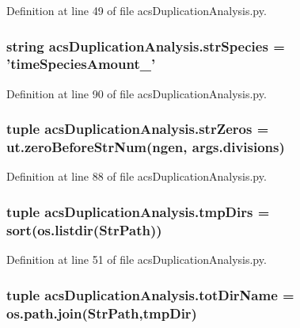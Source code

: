 Definition at line 49 of file acs\-Duplication\-Analysis.\-py.

\hypertarget{a00094_a16ce767c459a75b657e3a2592b4228d9}{
\subsubsection[{str\-Species}]{\setlength{\rightskip}{0pt plus 5cm}string acs\-Duplication\-Analysis.\-str\-Species = 'time\-Species\-Amount\-\_\-'}}\label{a00094_a16ce767c459a75b657e3a2592b4228d9}


Definition at line 90 of file acs\-Duplication\-Analysis.\-py.

\hypertarget{a00094_a234dce1a3fa6fada4ecff6272abe38f1}{
\subsubsection[{str\-Zeros}]{\setlength{\rightskip}{0pt plus 5cm}tuple acs\-Duplication\-Analysis.\-str\-Zeros = ut.\-zero\-Before\-Str\-Num(ngen, args.\-divisions)}}\label{a00094_a234dce1a3fa6fada4ecff6272abe38f1}


Definition at line 88 of file acs\-Duplication\-Analysis.\-py.

\hypertarget{a00094_a5030678434c0a50876042c56b443fb93}{
\subsubsection[{tmp\-Dirs}]{\setlength{\rightskip}{0pt plus 5cm}tuple acs\-Duplication\-Analysis.\-tmp\-Dirs = sort(os.\-listdir({\bf Str\-Path}))}}\label{a00094_a5030678434c0a50876042c56b443fb93}


Definition at line 51 of file acs\-Duplication\-Analysis.\-py.

\hypertarget{a00094_af2da42e1f2bbe8235624263867ef2719}{
\subsubsection[{tot\-Dir\-Name}]{\setlength{\rightskip}{0pt plus 5cm}tuple acs\-Duplication\-Analysis.\-tot\-Dir\-Name = os.\-path.\-join({\bf Str\-Path},tmp\-Dir)}}\label{a00094_af2da42e1f2bbe8235624263867ef2719}


